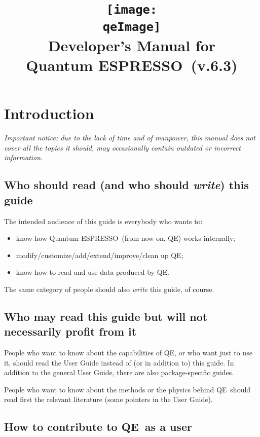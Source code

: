 \documentclass[12pt,a4paper]{article}
\def\version{6.3}
\def\QE{{\sc Quantum ESPRESSO}}
\def\qe{QE}
\def\qeImage{quantum_espresso}
\begin{document}
\author{}
\date{}
\title{
  \texttt{[image: \\qeImage]} \\
  \Huge Developer's Manual for \\ \QE\ (v.\version)
}
\maketitle

\tableofcontents

\newpage

\section{Introduction}

{\em Important notice: due to the lack of time and of manpower,
  this manual does not cover all the topics it should,
  may occasionally contain outdated or incorrect information.}

\subsection{Who should read (and who should {\em write}) this guide}

The intended audience of this guide is everybody who wants to:
\begin{itemize}
\item know how \QE\ (from now on, \qe) works internally;
\item modify/customize/add/extend/improve/clean up \qe;
\item know how to read and use data produced by \qe.
\end{itemize}
The same category of people should also {\em write} this guide, of course.

\subsection{Who may read this guide but will not necessarily profit from it}

People who want to know about the capabilities of \qe,
or who want just to use it, should read the User Guide
instead of (or in addition to) this guide. In addition
to the general User Guide, there are also package-specific
guides.

People who want to know about the methods or the physics
behind \qe\ should read first the relevant
literature (some pointers in the User Guide).

\subsection{How to contribute to \qe\ as a user}
\end{document}
